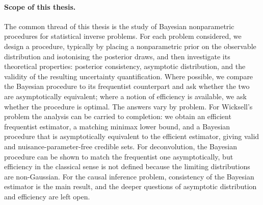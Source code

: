 \paragraph{Scope of this thesis.}\label{par: aim}
The common thread of this thesis is the study of Bayesian nonparametric procedures for statistical inverse problems. For each problem considered, we design a procedure, typically by placing a nonparametric prior on the observable distribution and isotonising the posterior draws, and then investigate its theoretical properties: posterior consistency, asymptotic distribution, and the validity of the resulting uncertainty quantification. Where possible, we compare the Bayesian procedure to its frequentist counterpart and ask whether the two are asymptotically equivalent; where a notion of efficiency is available, we ask whether the procedure is optimal. The answers vary by problem. For Wicksell's problem the analysis can be carried to completion: we obtain an efficient frequentist estimator, a matching minimax lower bound, and a Bayesian procedure that is asymptotically equivalent to the efficient estimator, giving valid and nuisance-parameter-free credible sets. For deconvolution, the Bayesian procedure can be shown to match the frequentist one asymptotically, but efficiency in the classical sense is not defined because the limiting distributions are non-Gaussian. For the causal inference problem, consistency of the Bayesian estimator is the main result, and the deeper questions of asymptotic distribution and efficiency are left open. 